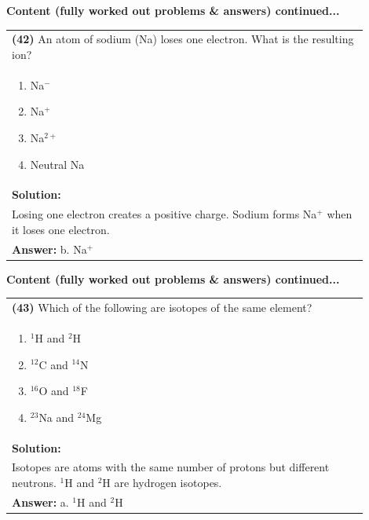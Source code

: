 \documentclass{article}
\begin{document}
{\noindent
{\large\textbf{Content (fully worked out problems \& answers) continued...}}\\[0.2em]
\vspace{0.2cm}
\begin{tabular}{|p{0.9\linewidth}|}
\hline
\vspace{0.2cm}
\textbf{(42)} An atom of sodium (Na) loses one electron. What is the resulting ion? \\
\begin{minipage}[t]{0.85\linewidth}
\begin{enumerate}[label=\alph*.]
\item Na$^-$ \
\item Na$^{+}$ \
\item Na$^{2+}$ \
\item Neutral Na
\end{enumerate}
\end{minipage}\\
\hline
\vspace{0.2cm}
\textbf{Solution:} \\
Losing one electron creates a positive charge. Sodium forms Na$^{+}$ when it loses one electron. \\
\hline
\vspace{0.2cm}
\textbf{Answer:} b. Na$^{+}$ \\
\hline
\end{tabular}
\newpage

\noindent
{\large\textbf{Content (fully worked out problems \& answers) continued...}}\\[0.2em]
\vspace{0.2cm}
\begin{tabular}{|p{0.9\linewidth}|}
\hline
\vspace{0.2cm}
\textbf{(43)} Which of the following are isotopes of the same element? \\
\begin{minipage}[t]{0.85\linewidth}
\begin{enumerate}[label=\alph*.]
\item $^{1}$H and $^{2}$H \
\item $^{12}$C and $^{14}$N \
\item $^{16}$O and $^{18}$F \
\item $^{23}$Na and $^{24}$Mg
\end{enumerate}
\end{minipage}\\
\hline
\vspace{0.2cm}
\textbf{Solution:} \\
Isotopes are atoms with the same number of protons but different neutrons. $^{1}$H and $^{2}$H are hydrogen isotopes. \\
\hline
\vspace{0.2cm}
\textbf{Answer:} a. $^{1}$H and $^{2}$H \\
\hline
\end{tabular}

}
\end{document}
